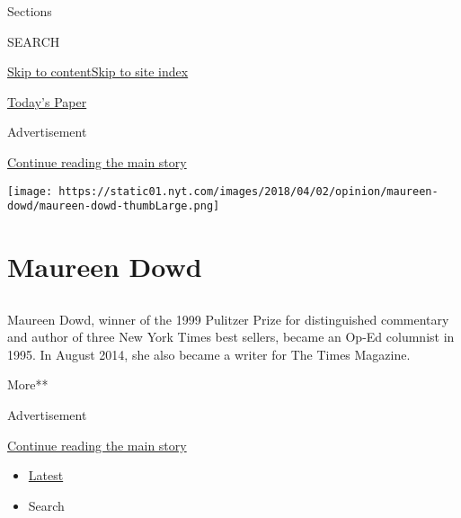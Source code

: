 Sections

SEARCH

\protect\hyperlink{site-content}{Skip to
content}\protect\hyperlink{site-index}{Skip to site index}

\href{https://myaccount.nytimes.com/auth/login?response_type=cookie\&client_id=vi}{}

\href{https://www.nytimes.com/section/todayspaper}{Today's Paper}

Advertisement

\protect\hyperlink{after-top}{Continue reading the main story}

\texttt{[image: https://static01.nyt.com/images/2018/04/02/opinion/maureen-dowd/maureen-dowd-thumbLarge.png]}

\hypertarget{maureen-dowd}{%
\section{Maureen Dowd}\label{maureen-dowd}}

\hypertarget{section}{%
\subsection{}\label{section}}

Maureen Dowd, winner of the 1999 Pulitzer Prize for distinguished
commentary and author of three New York Times best sellers, became an
Op-Ed columnist in 1995. In August 2014, she also became a writer for
The Times Magazine.

More**

Advertisement

\protect\hyperlink{after-mid1}{Continue reading the main story}

\begin{itemize}
\tightlist
\item
  \protect\hyperlink{stream-panel}{Latest}
\item
  Search
\end{itemize}

